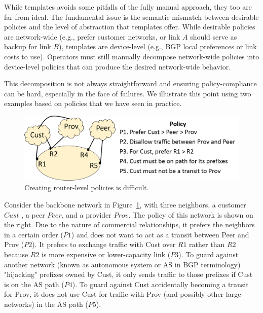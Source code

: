 While templates avoids some pitfalls of the fully manual approach, they too are far from ideal. The fundamental issue is the semantic mismatch between desirable policies and the level of abstraction that templates offer. While desirable policies are network-wide (e.g., prefer customer networks, or link $A$ should serve as backup for link $B$), templates are device-level (e.g., BGP local preferences or link costs to use). Operators must still manually decompose network-wide policies into device-level policies that can produce the desired network-wide behavior.

This decomposition is not always straightforward and ensuring policy-compliance can be hard, especially in the face of failures. We illustrate this point using two examples based on policies that we have seen in practice. 

\begin{figure}[t!]
\centering
\includegraphics[width=\columnwidth]{figures/example1}
\caption{Creating router-level policies is difficult.}
\label{fig:example1}
\end{figure}

Consider the backbone network in Figure~\ref{fig:example1}, with three neighbors, a customer $Cust$ , a peer $Peer$, and a provider $Prov$. The policy of this network is shown on the right. Due to the nature of commercial relationships, it prefers the neighbors in a certain order ($P1$) and does not want to act as a transit between Peer and Prov ($P2$). It prefers to exchange traffic with Cust over $R1$ rather than $R2$ because $R2$ is more expensive or lower-capacity link ($P3$). To guard against another network (known as autonomous system or AS in BGP terminology) "hijacking" prefixes owned by Cust, it only sends traffic to those prefixes if Cust is on the AS path ($P4$). To guard against Cust accidentally becoming a transit for Prov, it does not use Cust for traffic with Prov (and possibly other large networks) in the AS path ($P5$).


